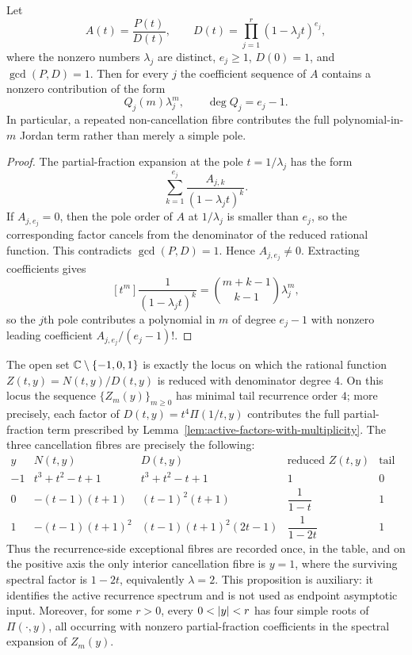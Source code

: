 \begin{lemma}\label{lem:active-factors-with-multiplicity}
Let
\[
A(t)=\frac{P(t)}{D(t)},
\qquad
D(t)=\prod_{j=1}^r(1-\lambda_j t)^{e_j},
\]
where the nonzero numbers \(\lambda_j\) are distinct, \(e_j\ge1\), \(D(0)=1\), and \(\gcd(P,D)=1\).  Then for every $j$ the coefficient sequence of $A$ contains a nonzero contribution of the form
\[
Q_j(m)\lambda_j^m,
\qquad
\deg Q_j=e_j-1.
\]
In particular, a repeated non-cancellation fibre contributes the full polynomial-in-$m$ Jordan term rather than merely a simple pole.
\end{lemma}
\begin{proof}
The partial-fraction expansion at the pole $t=1/\lambda_j$ has the form
\[
\sum_{k=1}^{e_j}\frac{A_{j,k}}{(1-\lambda_j t)^k}.
\]
If $A_{j,e_j}=0$, then the pole order of $A$ at $1/\lambda_j$ is smaller than $e_j$, so the corresponding factor cancels from the denominator of the reduced rational function.  This contradicts $\gcd(P,D)=1$.  Hence $A_{j,e_j}\ne0$.  Extracting coefficients gives
\[
[t^m]\frac{1}{(1-\lambda_j t)^k}=\binom{m+k-1}{k-1}\lambda_j^m,
\]
so the $j$th pole contributes a polynomial in $m$ of degree $e_j-1$ with nonzero leading coefficient $A_{j,e_j}/(e_j-1)!$.
\end{proof}

\begin{proposition}\label{prop:minimal-order}\label{prop:degenerate-fibers}\label{cor:complete-minimal-closure-classification}\label{prop:maximal-order-four-closure-locus}\label{prop:spectral-closure}
The open set \(\mathbb{C}\setminus\{-1,0,1\}\) is exactly the locus on which the rational function \(Z(t,y)=N(t,y)/D(t,y)\) is reduced with denominator degree \(4\).
On this locus the sequence \(\{Z_m(y)\}_{m\ge0}\) has minimal tail recurrence order \(4\); more precisely, each factor of \(D(t,y)=t^4\Pi(1/t,y)\) contributes the full partial-fraction term prescribed by Lemma~\ref{lem:active-factors-with-multiplicity}.
The three cancellation fibres are precisely the following:
\[
\begin{array}{c|c|c|c|c}
y & N(t,y) & D(t,y) & \text{reduced }Z(t,y) & \text{tail order} \\
\hline
-1 & t^3+t^2-t+1 & t^3+t^2-t+1 & 1 & 0 \\
0 & -(t-1)(t+1) & (t-1)^2(t+1) & \dfrac{1}{1-t} & 1 \\
1 & -(t-1)(t+1)^2 & (t-1)(t+1)^2(2t-1) & \dfrac{1}{1-2t} & 1
\end{array}
\]
Thus the recurrence-side exceptional fibres are recorded once, in the table, and on the positive axis the only interior cancellation fibre is \(y=1\), where the surviving spectral factor is \(1-2t\), equivalently \(\lambda=2\).  This proposition is auxiliary: it identifies the active recurrence spectrum and is not used as endpoint asymptotic input.
Moreover, for some \(r>0\), every \(0<\left\lvert y\right\rvert<r\) has four simple roots of \(\Pi(\cdot,y)\), all occurring with nonzero partial-fraction coefficients in the spectral expansion of \(Z_m(y)\).
\end{proposition}


